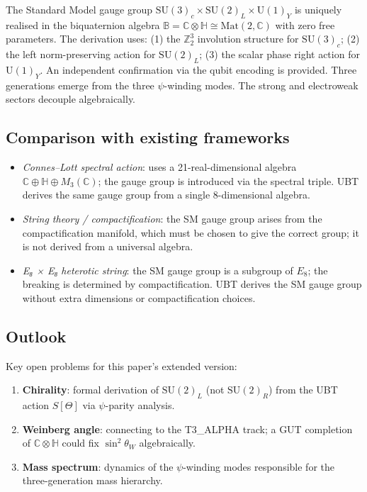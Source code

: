 \documentclass[12pt,a4paper]{article}
\theoremstyle{definition}
\theoremstyle{remark}
\newcommand{\SU}[1]{\mathrm{SU}(#1)}
\newcommand{\UU}[1]{\mathrm{U}(#1)}
\newcommand{\Bq}{\mathbb{C}\otimes\mathbb{H}}
\begin{document}
The Standard Model gauge group
$\SU{3}_c\times\SU{2}_L\times\UU{1}_Y$
is uniquely realised in the biquaternion algebra
$\mathbb{B} = \Bq\cong\mathrm{Mat}(2,\mathbb{C})$
with zero free parameters.  The derivation uses:
(1) the $\mathbb{Z}_2^3$ involution structure for $\SU{3}_c$;
(2) the left norm-preserving action for $\SU{2}_L$;
(3) the scalar phase right action for $\UU{1}_Y$.
An independent confirmation via the qubit encoding is provided.
Three generations emerge from the three $\psi$-winding modes.
The strong and electroweak sectors decouple algebraically.

\subsection{Comparison with existing frameworks}

\begin{itemize}
\item \emph{Connes--Lott spectral action}: uses a 21-real-dimensional
  algebra $\mathbb{C}\oplus\mathbb{H}\oplus M_3(\mathbb{C})$; the gauge
  group is introduced via the spectral triple.  UBT derives the same gauge
  group from a single 8-dimensional algebra.
\item \emph{String theory / compactification}: the SM gauge group arises
  from the compactification manifold, which must be chosen to give the
  correct group; it is not derived from a universal algebra.
\item \emph{E₈ × E₈ heterotic string}: the SM gauge group is a subgroup
  of $E_8$; the breaking is determined by compactification.  UBT derives
  the SM gauge group without extra dimensions or compactification choices.
\end{itemize}

\subsection{Outlook}

Key open problems for this paper's extended version:
\begin{enumerate}
\item \textbf{Chirality}: formal derivation of $\SU{2}_L$ (not $\SU{2}_R$)
  from the UBT action $S[\Theta]$ via $\psi$-parity analysis.
\item \textbf{Weinberg angle}: connecting to the T3\_ALPHA track; a GUT
  completion of $\Bq$ could fix $\sin^2\theta_W$ algebraically.
\item \textbf{Mass spectrum}: dynamics of the $\psi$-winding modes
  responsible for the three-generation mass hierarchy.
\end{enumerate}
\end{document}
